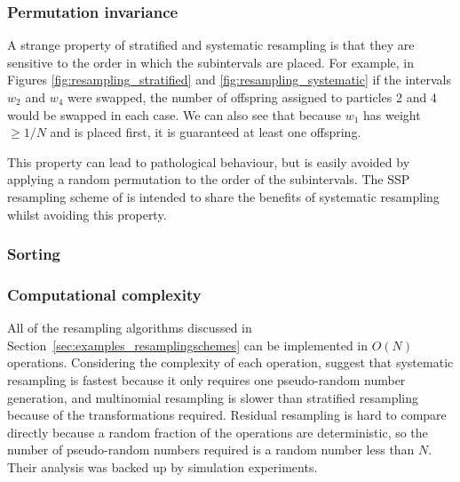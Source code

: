 \subsubsection{Permutation invariance \seb{$\checkmark$} }
A strange property of stratified and systematic resampling is that they are sensitive to the order in which the subintervals are placed. For example, in Figures \ref{fig:resampling_stratified} and \ref{fig:resampling_systematic} if the intervals $w_2$ and $w_4$ were swapped, the number of offspring assigned to particles 2 and 4 would be swapped in each case. 
We can also see that because $w_1$ has weight $\geq 1/N$ and is placed first, it is guaranteed at least one offspring.

This property can lead to pathological behaviour, but is easily avoided by applying a random permutation to the order of the subintervals.
The SSP resampling scheme of \textcite{gerber2017} is intended to share the benefits of systematic resampling whilst avoiding this property.




\subsubsection{Sorting}



\subsubsection{Computational complexity \seb{$\checkmark$} }
All of the resampling algorithms discussed in Section~\ref{sec:examples_resamplingschemes} can be implemented in $O(N)$ operations.
Considering the complexity of each operation, \textcite{hol2004,hol2006} suggest that systematic resampling is fastest because it only requires one pseudo-random number generation, and multinomial resampling is slower than stratified resampling because of the transformations required. Residual resampling is hard to compare directly because a random fraction of the operations are deterministic, so the number of pseudo-random numbers required is a random number less than $N$.
Their analysis was backed up by simulation experiments.

